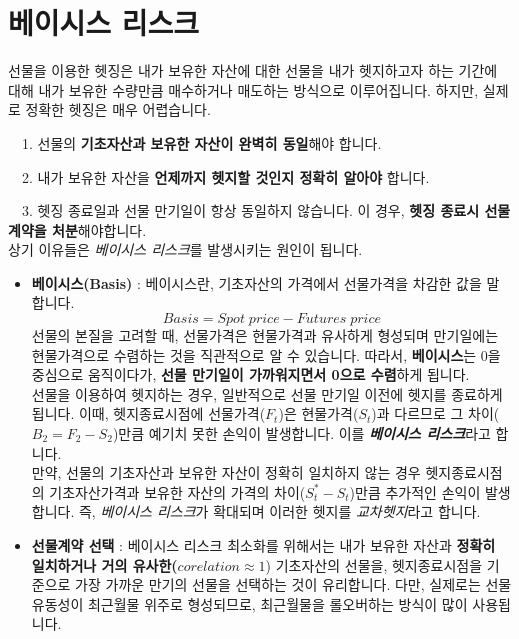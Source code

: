 \documentclass[
  letterpaper,
  DIV=11,
  numbers=noendperiod]{scrreprt}
\begin{document}
\section{베이시스
리스크}\label{uxbca0uxc774uxc2dcuxc2a4-uxb9acuxc2a4uxd06c}

선물을 이용한 헷징은 내가 보유한 자산에 대한 선물을 내가 헷지하고자 하는
기간에 대해 내가 보유한 수량만큼 매수하거나 매도하는 방식으로
이루어집니다. 하지만, 실제로 정확한 헷징은 매우 어렵습니다.\\
\strut ~~1. 선물의 \textbf{기초자산과 보유한 자산이 완벽히 동일}해야
합니다.\\
\strut ~~2. 내가 보유한 자산을 \textbf{언제까지 헷지할 것인지 정확히
알아야} 합니다.\\
\strut ~~3. 헷징 종료일과 선물 만기일이 항상 동일하지 않습니다. 이 경우,
\textbf{헷징 종료시 선물계약을 처분}해야합니다.\\
상기 이유들은 \emph{베이시스 리스크}를 발생시키는 원인이 됩니다.

\begin{itemize}
\item
  \textbf{베이시스(Basis)} : 베이시스란, 기초자산의 가격에서 선물가격을
  차감한 값을 말합니다. \[Basis = Spot\;price - Futures\;price\] 선물의
  본질을 고려할 때, 선물가격은 현물가격과 유사하게 형성되며 만기일에는
  현물가격으로 수렴하는 것을 직관적으로 알 수 있습니다. 따라서,
  \textbf{베이시스}는 0을 중심으로 움직이다가, \textbf{선물 만기일이
  가까워지면서 0으로 수렴}하게 됩니다.\\
  선물을 이용하여 헷지하는 경우, 일반적으로 선물 만기일 이전에 헷지를
  종료하게 됩니다. 이때, 헷지종료시점에 선물가격(\(F_t\))은
  현물가격(\(S_t\))과 다르므로 그 차이(\(B_2=F_2-S_2\))만큼 예기치 못한
  손익이 발생합니다. 이를 \textbf{\emph{베이시스 리스크}}라고 합니다.\\
  만약, 선물의 기초자산과 보유한 자산이 정확히 일치하지 않는 경우
  헷지종료시점의 기초자산가격과 보유한 자산의 가격의
  차이(\(S^*_t-S_t\))만큼 추가적인 손익이 발생합니다. 즉, \emph{베이시스
  리스크}가 확대되며 이러한 헷지를 \emph{교차헷지}라고 합니다.
\item
  \textbf{선물계약 선택} : 베이시스 리스크 최소화를 위해서는 내가 보유한
  자산과 \textbf{정확히 일치하거나 거의 유사한(}\(corelation\approx 1\))
  기초자산의 선물을, 헷지종료시점을 기준으로 가장 가까운 만기의 선물을
  선택하는 것이 유리합니다. 다만, 실제로는 선물 유동성이 최근월물 위주로
  형성되므로, 최근월물을 롤오버하는 방식이 많이 사용됩니다.
\end{itemize}
\end{document}
